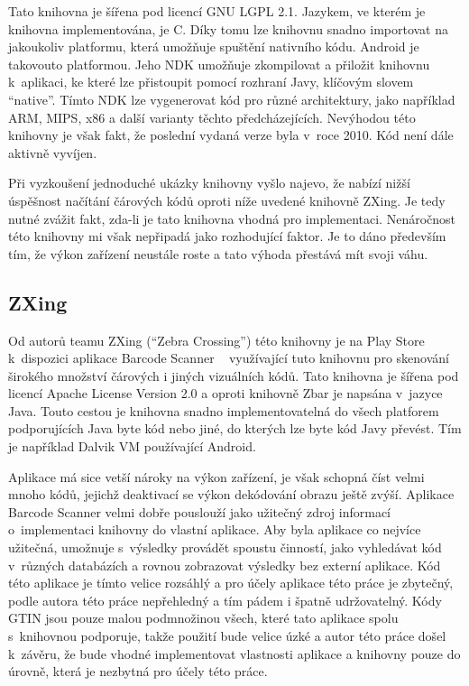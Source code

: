 \documentclass[thesis=B,czech]{FITthesis}[2013/10/20]
\begin{document}
Tato knihovna je šířena pod licencí GNU LGPL 2.1. Jazykem, ve kterém je knihovna implementována, je C. Díky tomu lze knihovnu snadno importovat na jakoukoliv platformu, která umožňuje spuštění nativního kódu. Android je takovouto platformou. Jeho NDK umožňuje zkompilovat a přiložit knihovnu k~aplikaci, ke které lze přistoupit pomocí rozhraní Javy, klíčovým slovem ``native''. Tímto NDK lze vygenerovat kód pro různé architektury, jako například ARM, MIPS, x86 a další varianty těchto předcházejících. Nevýhodou této knihovny je však fakt, že poslední vydaná verze byla v~roce 2010. Kód není dále aktivně vyvíjen.

Při vyzkoušení jednoduché ukázky knihovny vyšlo najevo, že nabízí nižší úspěšnost načítání čárových kódů oproti níže uvedené knihovně ZXing. Je tedy nutné zvážit fakt, zda-li je tato knihovna vhodná pro implementaci. Nenáročnost této knihovny mi však nepřipadá jako rozhodující faktor. Je to dáno především tím, že výkon zařízení neustále roste a tato výhoda přestává mít svoji váhu.

\subsection{ZXing ~\cite{zxing}}

Od autorů teamu ZXing (``Zebra Crossing'') této knihovny je na Play Store k~dispozici aplikace Barcode Scanner ~\cite{barcode_scanner} využívající tuto knihovnu pro skenování širokého množství čárových i jiných vizuálních kódů. Tato knihovna je šířena pod licencí Apache License Version 2.0 a oproti knihovně Zbar je napsána v~jazyce Java. Touto cestou je knihovna snadno implementovatelná do všech platforem podporujících Java byte kód nebo jiné, do kterých lze byte kód Javy převést. Tím je například Dalvik VM používající Android.

Aplikace má sice vetší nároky na výkon zařízení, je však schopná číst velmi mnoho kódů, jejichž deaktivací se výkon dekódování obrazu ještě zvýší. Aplikace Barcode Scanner velmi dobře pouslouží jako užitečný zdroj informací o~implementaci knihovny do vlastní aplikace. Aby byla aplikace co nejvíce užitečná, umožnuje s~výsledky provádět spoustu činností, jako vyhledávat kód v~různých databázích a rovnou zobrazovat výsledky bez externí aplikace. Kód této aplikace je tímto velice rozsáhlý a pro účely aplikace této práce je zbytečný, podle autora této práce nepřehledný a tím pádem i špatně udržovatelný. Kódy GTIN jsou pouze malou podmnožinou všech, které tato aplikace spolu s~knihovnou podporuje, takže použití bude velice úzké a autor této práce došel k~závěru, že bude vhodné implementovat vlastnosti aplikace a knihovny pouze do úrovně, která je nezbytná pro účely této práce.
\end{document}
